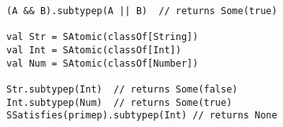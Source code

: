 \begin{lstlisting}[style=scalaioScala]
(A && B).subtypep(A || B)  // returns Some(true)
  
val Str = SAtomic(classOf[String])
val Int = SAtomic(classOf[Int])
val Num = SAtomic(classOf[Number])

Str.subtypep(Int)  // returns Some(false)
Int.subtypep(Num)  // returns Some(true)
SSatisfies(primep).subtypep(Int) // returns None
\end{lstlisting}
